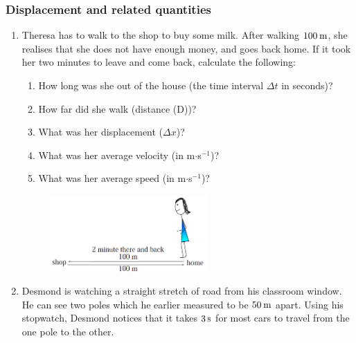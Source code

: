             \subsubsection{  Displacement and related quantities }
            \nopagebreak
        \label{m38791*id66624}\begin{enumerate}[noitemsep, label=\textbf{\arabic*}. ] 
            \label{m38791*uid38}\item Theresa has to walk to the shop to buy some milk. After walking $100\phantom{\rule{2pt}{0ex}}\mathrm{m}$, she realises that she does not have enough money, and goes back home. If it took her two minutes to leave and come back, calculate the following:
\label{m38791*id66641}\begin{enumerate}[noitemsep, label=\textbf{\alph*}. ] 
            \label{m38791*uid39}\item How long was she out of the house (the time interval $\Delta t$ in seconds)?
\label{m38791*uid40}\item How far did she walk (distance (D))?
\label{m38791*uid41}\item What was her displacement ($\Delta x$)?
\label{m38791*uid42}\item What was her average velocity (in m$\ensuremath{\cdot}$s${}^{-1}$)?
\label{m38791*uid43}\item What was her average speed (in m$\ensuremath{\cdot}$s${}^{-1}$)?
\end{enumerate}
    \setcounter{subfigure}{0}
	\begin{figure}[H] %
    \begin{center}
    \label{m38791*id66785!!!underscore!!!media}\label{m38791*id66785!!!underscore!!!printimage}\includegraphics[width=6cm]{col11305.imgs/m38791_PG10C2_016.png} %
      \vspace{2pt}
    \vspace{.1in}
    \end{center}
 \end{figure}               \label{m38791*uid44}\item Desmond is watching a straight stretch of road from his classroom window. He can see two poles which he earlier measured to be $50\phantom{\rule{2pt}{0ex}}\mathrm{m}$ apart. Using his stopwatch, Desmond notices that it takes $3\phantom{\rule{2pt}{0ex}}\mathrm{s}$ for most cars to travel from the one pole to the other.

\end{enumerate}
